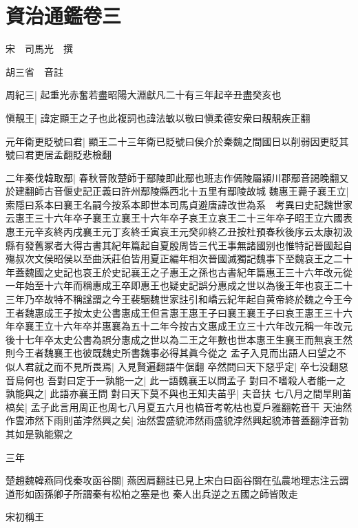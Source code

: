 \chapter{資治通鑑卷三}

宋　司馬光　撰

胡三省　音註

周紀三|{
	起重光赤奮若盡昭陽大淵獻凡二十有三年起辛丑盡癸亥也
	}


愼靚王|{
	諱定顯王之子也此複詞也諱法敏以敬曰愼柔德安衆曰靚靚疾正翻
	}


元年衛更貶號曰君|{
	顯王二十三年衛已貶號曰侯介於秦魏之間國日以削弱因更貶其號曰君更居孟翻貶悲檢翻
	}


二年秦伐韓取鄢|{
	春秋晉敗楚師于鄢陵即此鄢也班志作傿陵屬潁川郡鄢音謁晚翻又於建翻師古音偃史記正義曰許州鄢陵縣西北十五里有鄢陵故城
	}
魏惠王薨子襄王立|{
	索隱曰系本曰襄王名嗣今按系本即世本司馬貞避唐諱改世為系　考異曰史記魏世家云惠王三十六年卒子襄王立襄王十六年卒子哀王立哀王二十三年卒子昭王立六國表惠王元辛亥終丙戌襄王元丁亥終壬寅哀王元癸卯終乙丑按杜預春秋後序云太康初汲縣有發舊冢者大得古書其紀年篇起自夏殷周皆三代王事無諸國别也惟特記晉國起自殤叔次文侯昭侯以至曲沃莊伯皆用夏正編年相次晉國滅獨記魏事下至魏哀王之二十年蓋魏國之史記也哀王於史記襄王之子惠王之孫也古書紀年篇惠王三十六年改元從一年始至十六年而稱惠成王卒即惠王也疑史記誤分惠成之世以為後王年也哀王二十三年乃卒故特不稱諡謂之今王裴駰魏世家註引和嶠云紀年起自黄帝終於魏之今王今王者魏惠成王子按太史公書惠成王但言惠王惠王子曰襄王襄王子曰哀王惠王三十六年卒襄王立十六年卒并惠襄為五十二年今按古文惠成王立三十六年改元稱一年改元後十七年卒太史公書為誤分惠成之世以為二王之年數也世本惠王生襄王而無哀王然則今王者魏襄王也彼既魏史所書魏事必得其眞今從之
	}
孟子入見而出語人曰望之不似人君就之而不見所畏焉|{
	入見賢遍翻語牛倨翻
	}
卒然問曰天下惡乎定|{
	卒七没翻惡音烏何也
	}
吾對曰定于一孰能一之|{
	此一語魏襄王以問孟子
	}
對曰不嗜殺人者能一之孰能與之|{
	此語亦襄王問
	}
對曰天下莫不與也王知夫苖乎|{
	夫音扶
	}
七八月之間旱則苖槁矣|{
	孟子此言用周正也周七八月夏五六月也槁音考乾枯也夏戶雅翻乾音干
	}
天油然作雲沛然下雨則苖浡然興之矣|{
	油然雲盛貌沛然雨盛貌浡然興起貌沛普蓋翻浡音勃
	}
其如是孰能禦之

三年

楚趙魏韓燕同伐秦攻函谷關|{
	燕因肩翻註已見上宋白曰函谷關在弘農地理志注云謂道形如函孫卿子所謂秦有松柏之塞是也
	}
秦人出兵逆之五國之師皆敗走

宋初稱王

